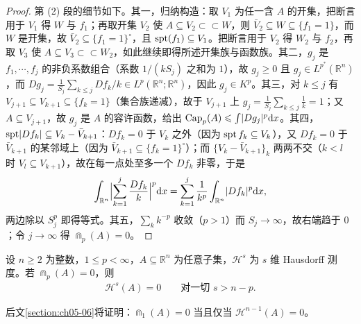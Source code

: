 \documentclass[../../main.tex]{subfiles}%
\begin{document}
\begin{proof}
第 (2) 段的细节如下。其一，归纳构造：取 $V_1$ 为任一含 $A$ 的开集，把断言用于 $V_1$ 得 $W$ 与 $f_1$；再取开集 $V_2$ 使 $A\subseteq V_2\subset\subset W$，则 $\bar V_2\subseteq W\subseteq\{f_1=1\}$，而 $W$ 是开集，故 $\bar V_2\subseteq\{f_1=1\}^{\circ}$，且 $\operatorname{spt}(f_1)\subseteq V_1$。把断言用于 $V_2$ 得 $W_2$ 与 $f_2$，再取 $V_3$ 使 $A\subseteq V_3\subset\subset W_2$，如此继续即得所述开集族与函数族。其二，$g_j$ 是 $f_1,\cdots,f_j$ 的非负系数组合（系数 $1/(kS_j)$ 之和为 $1$），故 $g_j\geqslant0$ 且 $g_j\in L^{p^*}(\mathbb{R}^n)$，而 $Dg_j=\frac{1}{S_j}\sum_{k\leqslant j}Df_k/k\in L^p(\mathbb{R}^n;\mathbb{R}^n)$，因此 $g_j\in K^p$。其三，对 $k\leqslant j$ 有 $V_{j+1}\subseteq V_{k+1}\subseteq\{f_k=1\}$（集合族递减），故于 $V_{j+1}$ 上 $g_j=\frac{1}{S_j}\sum_{k\leqslant j}\frac1k=1$；又 $A\subseteq V_{j+1}$，故 $g_j$ 是 $A$ 的容许函数，给出 $\operatorname{Cap}_p(A)\leqslant\int\lvert Dg_j\rvert^p\mathrm{d} x$。其四，$\operatorname{spt}\lvert Df_k\rvert\subseteq V_k-\bar V_{k+1}$：$Df_k=0$ 于 $V_k$ 之外（因为 $\operatorname{spt} f_k\subseteq V_k$），又 $Df_k=0$ 于 $\bar V_{k+1}$ 的某邻域上（因为 $\bar V_{k+1}\subseteq\{f_k=1\}^{\circ}$）；而 $\{V_k-\bar V_{k+1}\}_{k}$ 两两不交（$k<l$ 时 $V_l\subseteq V_{k+1}$），故在每一点处至多一个 $Df_k$ 非零，于是
\begin{align*}
\int_{\mathbb{R}^n}\Bigl\lvert\sum_{k=1}^j\frac{Df_k}{k}\Bigr\rvert^p\mathrm{d} x=\sum_{k=1}^j\frac{1}{k^p}\int_{\mathbb{R}^n}\lvert Df_k\rvert^p\mathrm{d} x ,
\end{align*}
两边除以 $S_j^p$ 即得等式。其五，$\sum_k k^{-p}$ 收敛（$p>1$）而 $S_j\to\infty$，故右端趋于 $0$；令 $j\to\infty$ 得 $\Cap_p(A)=0$。
\end{proof}

\begin{theorem}\label{theorem:ch04-4-17}
设 $n\geqslant2$ 为整数，$1\leqslant p<\infty$，$A\subseteq\mathbb{R}^n$ 为任意子集，$\mathcal{H}^s$ 为 $s$ 维 Hausdorff 测度。若 $\Cap_p(A)=0$，则
\begin{align*}
\mathcal{H}^s(A)=0\qquad\text{对一切 }s>n-p .
\end{align*}
\end{theorem}

\begin{remark}\label{remark:ch04-thm-4-17-注}
后文\cref{section:ch05-06}将证明：$\Cap_1(A)=0$ 当且仅当 $\mathcal{H}^{n-1}(A)=0$。%
\end{remark}
\end{document}
